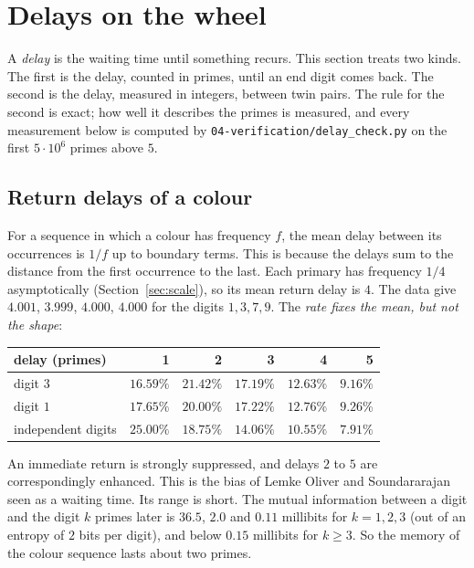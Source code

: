 \documentclass[11pt]{article}
\theoremstyle{plain}
\theoremstyle{definition}
\theoremstyle{remark}
\begin{document}
\section{Delays on the wheel}\label{sec:delay}

A \emph{delay} is the waiting time until something recurs. This section treats two kinds. The
first is the delay, counted in primes, until an end digit comes back. The second is the delay,
measured in integers, between twin pairs. The rule for the second is exact; how well it describes
the primes is measured, and every measurement below is computed by
\texttt{04-verification/delay\_check.py} on the first $5\cdot10^6$ primes above $5$.

\subsection{Return delays of a colour}

For a sequence in which a colour has frequency $f$, the mean delay between its occurrences is
$1/f$ up to boundary terms. This is because the delays sum to the distance from the first
occurrence to the last. Each primary has frequency $1/4$ asymptotically (Section~\ref{sec:scale}),
so its mean return delay is $4$. The data give $4.001$, $3.999$, $4.000$, $4.000$ for the digits
$1,3,7,9$. The \emph{rate fixes the mean, but not the shape}:

\begin{center}
\begin{tabular}{@{}lrrrrr@{}}
\toprule
delay (primes) & 1 & 2 & 3 & 4 & 5\\
\midrule
digit $3$ & $16.59\%$ & $21.42\%$ & $17.19\%$ & $12.63\%$ & $9.16\%$\\
digit $1$ & $17.65\%$ & $20.00\%$ & $17.22\%$ & $12.76\%$ & $9.26\%$\\
independent digits & $25.00\%$ & $18.75\%$ & $14.06\%$ & $10.55\%$ & $7.91\%$\\
\bottomrule
\end{tabular}
\end{center}

\noindent
An immediate return is strongly suppressed, and delays $2$ to $5$ are correspondingly enhanced.
This is the bias of Lemke Oliver and Soundararajan \cite{LOS} seen as a waiting time. Its range is
short. The mutual information between a digit and the digit $k$ primes later is $36.5$, $2.0$ and
$0.11$ millibits for $k=1,2,3$ (out of an entropy of $2$ bits per digit), and below $0.15$
millibits for $k\ge3$. So the memory of the colour sequence lasts about two primes.
\end{document}
